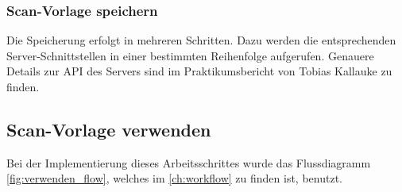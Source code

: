 \documentclass[notables, nomenclature, oneside, 150]{HSMW-Thesis}
\begin{document}
			\subsubsection*{Scan-Vorlage speichern}
				Die Speicherung erfolgt in mehreren Schritten. Dazu werden die entsprechenden Server-Schnittstellen in einer bestimmten Reihenfolge aufgerufen. Genauere Details zur API des Servers sind im Praktikumsbericht von Tobias Kallauke zu finden.
				
			
			
		\newpage
		\subsection{Scan-Vorlage verwenden}
			Bei der Implementierung dieses Arbeitsschrittes wurde das Flussdiagramm \ref{fig:verwenden_flow}, welches im \autoref{ch:workflow} zu finden ist, benutzt.
			
\end{document}
